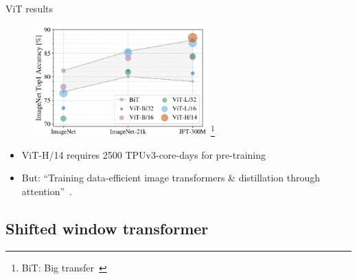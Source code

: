 \documentclass[xcolor=pdftex,dvipsnames,table,mathserif]{beamer}
\begin{document}
\begin{frame}{ViT results}

\begin{figure}[ht]
  \centering
  \includegraphics[width=0.6\textwidth]{vit_graph}
  \footnote{BiT: Big transfer~\cite{kolesnikov_big_2020}}
\end{figure}



\begin{itemize}
  \item ViT-H/14 requires 2500 TPUv3-core-days for pre-training
  \item But: ``Training data-efficient image transformers \& distillation through attention''~\cite{touvron_training_2021}.

\end{itemize}

\end{frame}


\subsection{Shifted window transformer}
\end{document}
